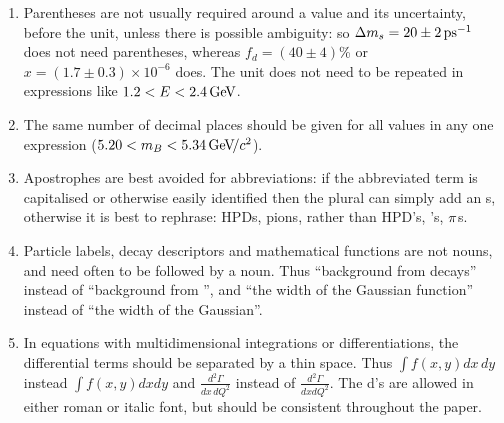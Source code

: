 \begin{enumerate}
\item Parentheses are not usually required around a value and its
  uncertainty, before the unit, unless there is possible ambiguity: so
  ${\Delta m_{{s}}} = 20 \pm 2{\mathrm{ \,ps^{-1}}}$ does not need parentheses, whereas $f_d =
  (40 \pm 4)$\% or $x=(1.7\pm0.3)\times 10^{-6}$ does.
  The unit does not need to be repeated in
  expressions like $1.2 < E < 2.4\mathrm{\,Ge\kern -0.1em V}$.

\item The same number of decimal places should be given for all values
  in any one expression (\eg $5.20 < m_B < 5.34{\mathrm{\,Ge\kern -0.1em V\!/}c^2}$).

\item Apostrophes are best avoided for abbreviations: if the abbreviated term
  is capitalised or otherwise easily identified then the plural can simply add
  an s, otherwise it is best to rephrase: \eg HPDs, pions, rather
  than HPD's, \piz's, ${\pi}$s.

\item Particle labels, decay descriptors and mathematical functions are not nouns, and need often to be followed by a noun. 
Thus ``background from \decay{\Bd}{\pip\pim} decays'' instead of ``background from \decay{\Bd}{\pip\pim}'',
and ``the width of the Gaussian function'' instead of ``the width of the Gaussian''.

\item In equations with multidimensional integrations or differentiations, the differential terms should be separated by a thin space. 
Thus $\int f(x,y) dx\,dy$ instead $\int f(x,y) dxdy$ and
$\frac{d^2\Gamma}{dx\,dQ^2}$ instead of $\frac{d^2\Gamma}{dxdQ^2}$.
The d's are allowed in either roman or italic font, but should be consistent throughout the paper.


\end{enumerate}
